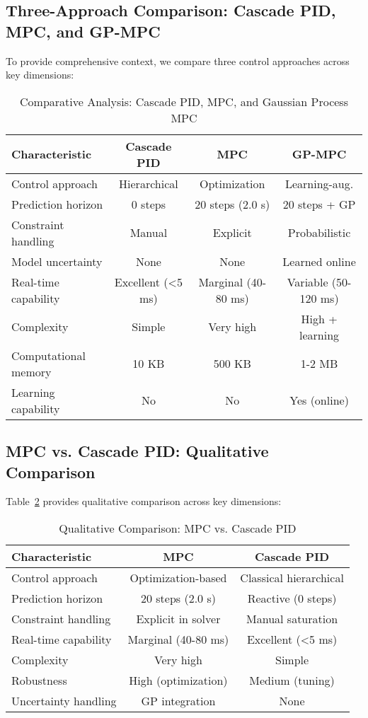 \documentclass[journal]{IEEEtran}
\begin{document}
\subsection{Three-Approach Comparison: Cascade PID, MPC, and GP-MPC}

To provide comprehensive context, we compare three control approaches across key dimensions:

\begin{table}[htbp]
\centering
\caption{Comparative Analysis: Cascade PID, MPC, and Gaussian Process MPC}
\begin{tabular}{|l|c|c|c|}
\hline
\textbf{Characteristic} & \textbf{Cascade PID} & \textbf{MPC} & \textbf{GP-MPC} \\
\hline
Control approach & Hierarchical & Optimization & Learning-aug. \\
Prediction horizon & 0 steps & 20 steps (2.0 s) & 20 steps + GP \\
Constraint handling & Manual & Explicit & Probabilistic \\
Model uncertainty & None & None & Learned online \\
Real-time capability & Excellent (<5 ms) & Marginal (40-80 ms) & Variable (50-120 ms) \\
Complexity & Simple & Very high & High + learning \\
Computational memory & 10 KB & 500 KB & 1-2 MB \\
Learning capability & No & No & Yes (online) \\
\hline
\end{tabular}
\label{tab:three_approaches}
\end{table}

\subsection{MPC vs. Cascade PID: Qualitative Comparison}

Table~\ref{tab:mpc_cascade_comparison} provides qualitative comparison across key dimensions:

\begin{table}[htbp]
\centering
\caption{Qualitative Comparison: MPC vs. Cascade PID}
\begin{tabular}{|l|c|c|}
\hline
\textbf{Characteristic} & \textbf{MPC} & \textbf{Cascade PID} \\
\hline
Control approach & Optimization-based & Classical hierarchical \\
Prediction horizon & 20 steps (2.0 s) & Reactive (0 steps) \\
Constraint handling & Explicit in solver & Manual saturation \\
Real-time capability & Marginal (40-80 ms) & Excellent (<5 ms) \\
Complexity & Very high & Simple \\
Robustness & High (optimization) & Medium (tuning) \\
Uncertainty handling & GP integration & None \\
\hline
\end{tabular}
\label{tab:mpc_cascade_comparison}
\end{table}
\end{document}
